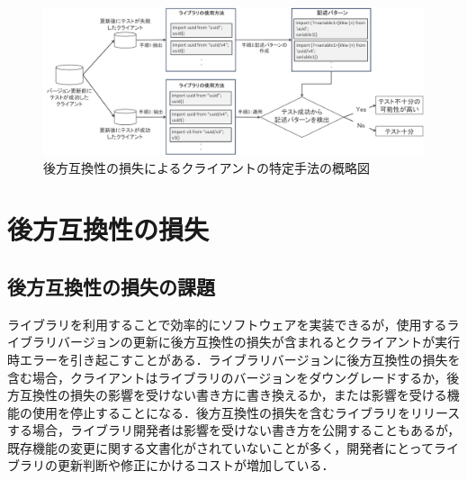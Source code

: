 \documentclass[T,J]{fose} %
\begin{document}
\begin{figure}[t]
\centerline{\includegraphics[width=1.0\linewidth]{Iida_fig/Fose_method.pdf}}
\caption{後方互換性の損失によるクライアントの特定手法の概略図}
\label{fig:method-overview}
\end{figure}

\section{後方互換性の損失}\label{chap:intro}

\subsection{後方互換性の損失の課題}
ライブラリを利用することで効率的にソフトウェアを実装できるが，使用するライブラリバージョンの更新に後方互換性の損失が含まれるとクライアントが実行時エラーを引き起こすことがある．ライブラリバージョンに後方互換性の損失を含む場合，クライアントはライブラリのバージョンをダウングレードするか，後方互換性の損失の影響を受けない書き方に書き換えるか，または影響を受ける機能の使用を停止することになる．後方互換性の損失を含むライブラリをリリースする場合，ライブラリ開発者は影響を受けない書き方を公開することもあるが，既存機能の変更に関する文書化がされていないことが多く，開発者にとってライブラリの更新判断や修正にかけるコストが増加している\cite{mostafa2017experience}．
\end{document}
